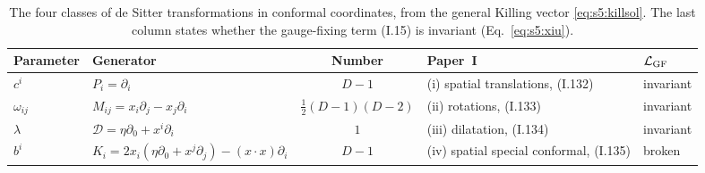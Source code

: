 \documentclass[aps,prd,onecolumn,10pt,nofootinbib,floatfix]{revtex4-2}
\newcommand{\PI}{Paper~I}
\newcommand{\eqI}[1]{(I.#1)}
\begin{document}
\begin{table}[tb]
\caption{The four classes of de Sitter transformations in conformal coordinates, from the general Killing vector \eqref{eq:s5:killsol}. The last column states whether the gauge-fixing term \eqI{15} is invariant (Eq.~\eqref{eq:s5:xiu}).}
\label{tab:s5:classes}
\renewcommand{\arraystretch}{1.2}
\begin{ruledtabular}
\begin{tabular}{llcll}
Parameter & Generator & Number & \PI & $\mathcal{L}_{\rm GF}$\\
\hline
$c^i$ & $P_i=\partial_i$ & $D-1$ & (i) spatial translations, \eqI{132} & invariant\\
$\omega_{ij}$ & $M_{ij}=x_i\partial_j-x_j\partial_i$ & $\tfrac12(D-1)(D-2)$ & (ii) rotations, \eqI{133} & invariant\\
$\lambda$ & $\mathcal D=\eta\partial_0+x^i\partial_i$ & $1$ & (iii) dilatation, \eqI{134} & invariant\\
$b^i$ & $K_i=2x_i(\eta\partial_0+x^j\partial_j)-(x\cdot x)\partial_i$ & $D-1$ & (iv) spatial special conformal, \eqI{135} & broken\\
\end{tabular}
\end{ruledtabular}
\end{table}
\end{document}
